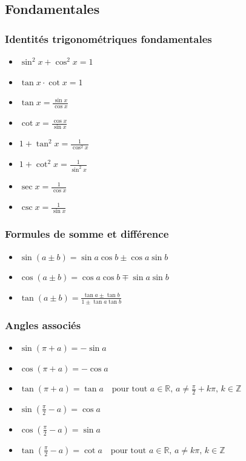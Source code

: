 \documentclass[12]{article}%
\theoremstyle{plain}
\theoremstyle{definition}
\theoremstyle{remark}
\begin{document}
\subsection{Fondamentales}
\subsubsection{Identités trigonométriques fondamentales}
\begin{itemize}
	\item \( \boxed{\sin^2 x + \cos^2 x = 1} \)
	\item \( \boxed{\tan x \cdot \cot x = 1} \)
	\item \( \boxed{\tan x = \frac{\sin x}{\cos x}} \)
	\item \( \boxed{\cot x = \frac{\cos x}{\sin x}} \)
	\item \( \boxed{1 + \tan^2 x = \frac{1}{\cos^2 x}} \)
	\item \( \boxed{1 + \cot^2 x = \frac{1}{\sin^2 x}} \)
	\item \( \boxed{\sec x = \frac{1}{\cos x}} \)
	\item \( \boxed{\csc x = \frac{1}{\sin x}} \)
\end{itemize}

\subsubsection{Formules de somme et différence}
\begin{itemize}
	\item \( \boxed{\sin(a \pm b) = \sin a \cos b \pm \cos a \sin b} \)
	\item \( \boxed{\cos(a \pm b) = \cos a \cos b \mp \sin a \sin b} \)
	\item \( \boxed{\tan(a \pm b) = \frac{\tan a \pm \tan b}{1 \pm \tan a \tan b}} \)
\end{itemize}

\subsubsection{Angles associés}
\begin{itemize}
	\item \( \boxed{\sin(\pi + a) = -\sin a} \)
	\item \( \boxed{\cos(\pi + a) = -\cos a} \)
	\item \( \boxed{\tan(\pi + a) = \tan a} \quad \text{pour tout } a \in \mathbb{R}, \, a \neq \frac{\pi}{2} + k\pi, \, k \in \mathbb{Z} \)
\end{itemize}
\begin{itemize}
	\item \( \boxed{\sin\left(\frac{\pi}{2} - a\right) = \cos a} \)
	\item \( \boxed{\cos\left(\frac{\pi}{2} - a\right) = \sin a} \)
	\item \( \boxed{\tan\left(\frac{\pi}{2} - a\right) = \cot a} \quad \text{pour tout } a \in \mathbb{R}, \, a \neq k\pi, \, k \in \mathbb{Z} \)
\end{itemize}
\end{document}
